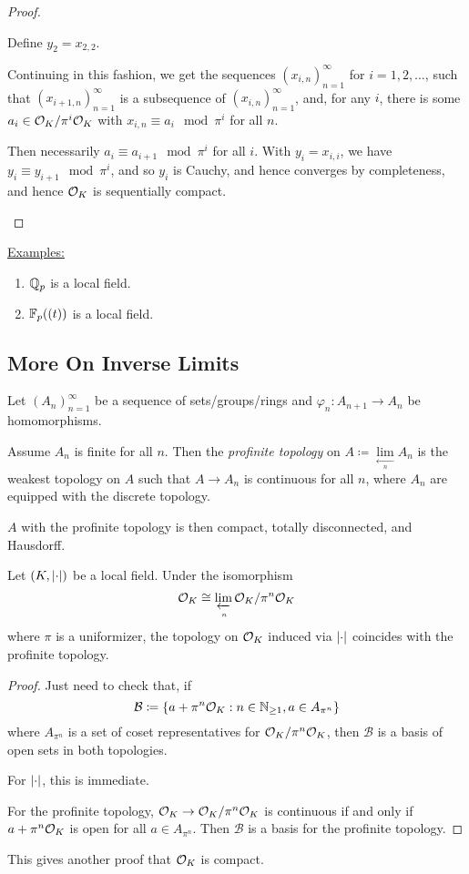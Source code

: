 \documentclass[10pt,a4paper]{article}
\begin{document}
\begin{proof}
\begin{itemize}
    Define $y_2 = x_{2,2}$.

    Continuing in this fashion, we get the sequences $(x_{i,n})_{n=1}^\infty$ for $i=1,2,\ldots$, such that $(x_{i+1, n})_{n=1}^\infty$ is a subsequence of $(x_{i,n})_{n=1}^\infty$, and, for any $i$, there is some $a_i \in \mathcal{O}_K/\pi^i\mathcal{O}_K$ with $x_{i,n} \equiv a_i \mod \pi^i$ for all $n$.

    Then necessarily $a_i \equiv a_{i+1} \mod \pi^i$ for all $i$. With $y_i = x_{i,i}$, we have $y_i \equiv y_{i+1} \mod \pi^i$, and so $y_i$ is Cauchy, and hence converges by completeness, and hence $\mathcal{O}_K$ is sequentially compact.
  \end{itemize}
\end{proof}
\underline{Examples:}
\begin{enumerate}
  \item $\mathbb{Q}_p$ is a local field.
  \item $\mathbb{F}_p((t))$ is a local field.
\end{enumerate}
\subsection{More On Inverse Limits}
Let $(A_n)_{n=1}^\infty$ be a sequence of sets/groups/rings and $\varphi_n :A_{n+1}\to A_n$ be homomorphisms.
\begin{definition}
  Assume $A_n$ is finite for all $n$. Then the \emph{profinite topology} on $A \coloneqq \lim\limits_{\xleftarrow[n]{}}A_n$ is the weakest topology on $A$ such that $A \to A_n$ is continuous for all $n$, where $A_n$ are equipped with the discrete topology.
\end{definition}
$A$ with the profinite topology is then compact, totally disconnected, and Hausdorff.

\begin{proposition}
  Let $(K, \lvert\cdot\rvert)$ be a local field. Under the isomorphism
  \[ \mathcal{O}_K \cong \lim_{\xleftarrow[n]{}}\mathcal{O}_K/\pi^n\mathcal{O}_K\]
  where $\pi$ is a uniformizer, the topology on $\mathcal{O}_K$ induced via $\lvert\cdot\rvert$ coincides with the profinite topology.
\end{proposition}
\begin{proof}
  Just need to check that, if
  \[\mathcal{B}\coloneqq \{a+\pi^n \mathcal{O}_K : n \in \mathbb{N}_{\geq 1}, a \in A_{\pi^n}\}\]
  where $A_{\pi^n}$ is a set of coset representatives for $\mathcal{O}_K/\pi^n\mathcal{O}_K$, then $\mathcal{B}$ is a basis of open sets in both topologies.

  For $\lvert\cdot\rvert$, this is immediate.

  For the profinite topology, $\mathcal{O}_K \to \mathcal{O}_K/\pi^n \mathcal{O}_K$ is continuous if and only if $a+\pi^n \mathcal{O}_K$ is open for all $a \in A_{\pi^n}$. Then $\mathcal{B}$ is a basis for the profinite topology.
\end{proof}
This gives another proof that $\mathcal{O}_K$ is compact.
\end{document}
